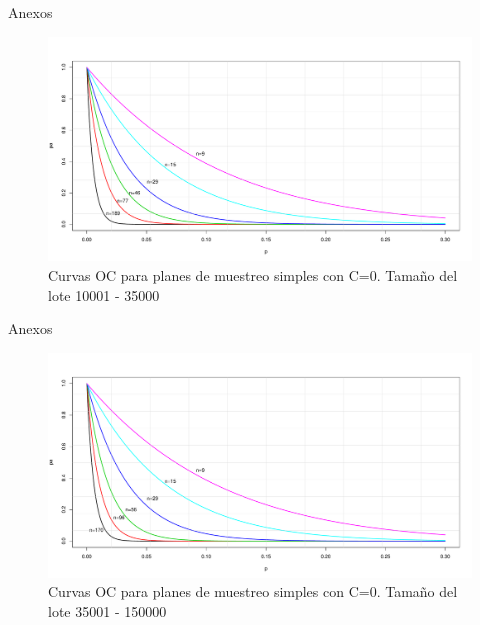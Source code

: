\documentclass[10pt]{beamer}
\begin{document}
\begin{frame}{Anexos}
\begin{figure}[h!]
  \centering
  \includegraphics[scale=0.33]{FigurasUV/CO12.pdf}
  \caption{Curvas OC para planes de muestreo simples con C=0. Tamaño del lote 10001 - 35000}
\end{figure}
\end{frame}

\begin{frame}{Anexos}
\begin{figure}[h!]
  \centering
  \includegraphics[scale=0.33]{FigurasUV/CO13.pdf}
  \caption{Curvas OC para planes de muestreo simples con C=0. Tamaño del lote 35001 - 150000}
\end{figure}
\end{frame}
\end{document}
